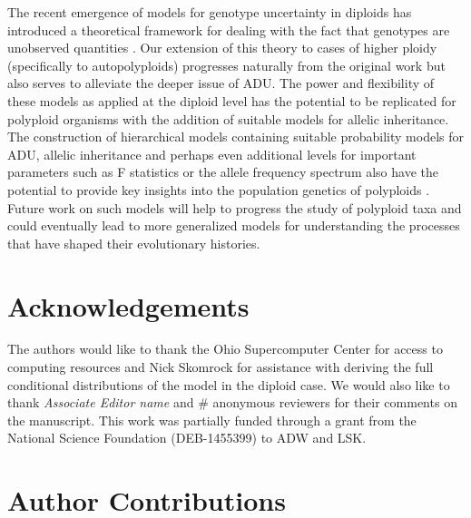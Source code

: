 \documentclass[11pt,english,letterpaper,oneside]{article}
\begin{document}
The recent emergence of models for genotype uncertainty in diploids has introduced a theoretical framework for dealing with the fact that genotypes are unobserved quantities \citep{gompert2012bgc,buerkle2013popModels}. Our extension of this theory to cases of higher ploidy (specifically to autopolyploids) progresses naturally from the original work but also serves to alleviate the deeper issue of ADU. The power and flexibility of these models as applied at the diploid level has the potential to be replicated for polyploid organisms with the addition of suitable models for allelic inheritance. The construction of hierarchical models containing suitable probability models for ADU, allelic inheritance and perhaps even additional levels for important parameters such as F statistics or the allele frequency spectrum also have the potential to provide key insights into the population genetics of polyploids \citep{gompert2011bamova,buerkle2013popModels}. Future work on such models will help to progress the study of polyploid taxa and could eventually lead to more generalized models for understanding the processes that have shaped their evolutionary histories.
\medskip

\section*{Acknowledgements}           %

The authors would like to thank the Ohio Supercomputer Center for access to computing resources and Nick Skomrock for assistance with deriving the full conditional distributions of the model in the diploid case. We would also like to thank \textit{Associate Editor name} and \# anonymous reviewers for their comments on the manuscript. This work was partially funded through a grant from the National Science Foundation (DEB-1455399) to ADW and LSK.
\bigskip



\singlespacing




\doublespacing

\section*{Author Contributions}        %
\end{document}
